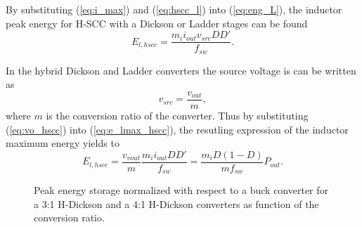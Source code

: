 By substituting (\ref{eq:i_max}) and (\ref{eq:hscc_l}) into (\ref{eq:eng_L}), the inductor peak energy for H-SCC with a Dickson or Ladder stages can be found
\begin{equation}
E_{l,hscc}  =   \frac{ m_{i} i_{out} v_{src}  DD'}{f_{sw}}.
\label{eq:e_lmax_hscc}
\end{equation}

In the hybrid Dickson and Ladder converters the source voltage is can be written as
\begin{equation}
v_{src}  =  \frac{v_{out}} {m},
\label{eq:vo_hscc}
\end{equation}
where $m$ is the conversion ratio of the converter. Thus by substituting (\ref{eq:vo_hscc}) into (\ref{eq:e_lmax_hscc}), the resutling expression of the inductor maximum energy yields to
\begin{equation}
E_{l,hscc}  =  \frac{v_{vout}}{m} \frac{ m_i i_{out}  DD'}{f_{sw}} = \frac{m_i D (1-D)}{m f_{sw}} P_{out}.
\label{eq:e_lmax_hscc_II}
\end{equation}



\begin{SCfigure}
\centering
{}
\caption{Peak energy storage normalized with respect to a buck converter for a 3:1 H-Dickson and a 4:1 H-Dickson converters as function of the conversion ratio.}
\label{fig:inductor_normal}
\end{SCfigure}



